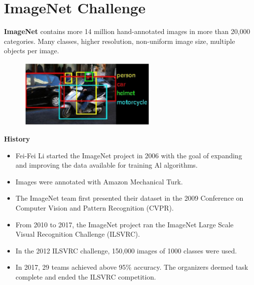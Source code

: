 \chapter{ImageNet Challenge}

\begin{definition}
    \textbf{ImageNet} contains more 14 million hand-annotated images in more than 20,000 categories.
    Many classes, higher resolution, non-uniform image size, multiple objects per image.

    \begin{figure}[H]
        \centering
        \includegraphics[width=0.6\textwidth]{.././assets/7.1.jpg}
    \end{figure}

    \par\noindent\textcolor{gray}{\hdashrule{\textwidth}{0.4pt}{1pt 2pt}}

    \textbf{History}

    \begin{itemize}
        \item Fei-Fei Li started the ImageNet project in 2006 with the goal of expanding and improving the data available for training Al algorithms.
        \item Images were annotated with Amazon Mechanical Turk.
        \item The ImageNet team first presented their dataset in the 2009 Conference on Computer Vision and Pattern Recognition (CVPR).
        \item From 2010 to 2017, the ImageNet project ran the ImageNet Large Scale Visual Recognition Challenge (ILSVRC).
        \item In the 2012 ILSVRC challenge, 150,000 images of 1000 classes were used.
        \item In 2017, 29 teams achieved above 95\% accuracy. The organizers deemed task complete and ended the ILSVRC competition.
    \end{itemize}

    \par\noindent\textcolor{gray}{\hdashrule{\textwidth}{0.4pt}{1pt 2pt}}


\end{definition}
